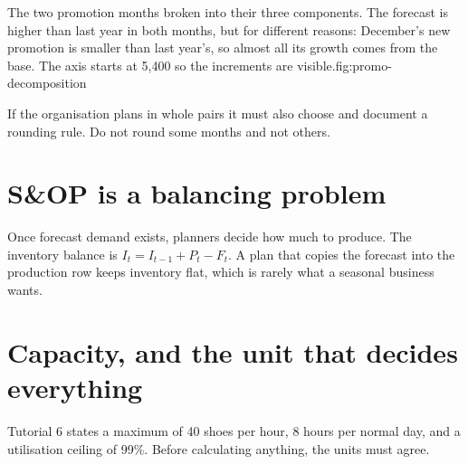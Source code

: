 \begin{utpfig}{The two promotion months broken
into their three components. The forecast is higher than last year in both
months, but for different reasons: December's new promotion is smaller than last
year's, so almost all its growth comes from the base. The axis starts at 5,400
so the increments are visible.}{fig:promo-decomposition}
\end{utpfig}

If the organisation plans in whole pairs it must also choose and document a
rounding rule. Do not round some months and not others.

\section{S\&OP is a balancing problem}

Once forecast demand exists, planners decide how much to produce. The inventory
balance is $I_t = I_{t-1} + P_t - F_t$. A plan that copies the forecast into the
production row keeps inventory flat, which is rarely what a seasonal business
wants.

\section{Capacity, and the unit that decides everything}

Tutorial 6 states a maximum of 40 shoes per hour, 8 hours per normal day, and a
utilisation ceiling of 99\%. Before calculating anything, the units must agree.

